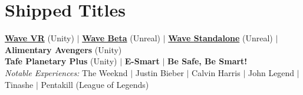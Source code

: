 \documentclass[letterpaper,11pt]{article}
\begin{document}
	\section*{Shipped Titles}
	\begin{itemize}[leftmargin=0.15in, label={}]
		\small{\item{
				\href{https://store.steampowered.com/app/453000/Wave_Beta/}{\textbf{Wave VR}} (Unity) $|$
				\href{https://www.meta.com/experiences/wave-beta/7011698248940643/}{\textbf{Wave Beta}} (Unreal) $|$ \href{https://www.picoxr.com/global/games/wave}{\textbf{Wave Standalone}} (Unreal) $|$ \textbf{Alimentary Avengers} (Unity) \\
				\textbf{Tafe Planetary Plus} (Unity) $|$ \textbf{E-Smart} $|$ \textbf{Be Safe, Be Smart!} \\
				\textit{Notable Experiences:} The Weeknd $|$ Justin Bieber $|$ Calvin Harris $|$ John Legend $|$ Tinashe $|$ Pentakill (League of Legends)
		}}
	\end{itemize}
	
\end{document}
